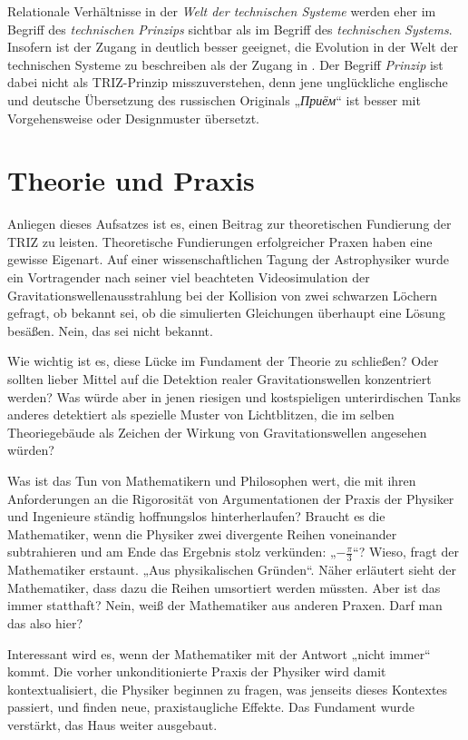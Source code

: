 \documentclass[11pt,a4paper]{article}
\begin{document}
Relationale Verhältnisse in der \emph{Welt der technischen Systeme} werden
eher im Begriff des \emph{technischen Prinzips} sichtbar als im Begriff des
\emph{technischen Systems}. Insofern ist der Zugang in \cite{Shpakovsky2010}
deutlich besser geeignet, die Evolution in der Welt der technischen Systeme zu
beschreiben als der Zugang in \cite{TESE2018}.  Der Begriff \emph{Prinzip} ist
dabei nicht als TRIZ-Prinzip misszuverstehen, denn jene unglückliche englische
und deutsche Übersetzung des russischen Originals
„\emph{\foreignlanguage{russian}{Приём}}“ ist besser mit Vorgehensweise oder
Designmuster übersetzt.

\section{Theorie und Praxis}

Anliegen dieses Aufsatzes ist es, einen Beitrag zur theoretischen Fundierung
der TRIZ zu leisten. Theoretische Fundierungen erfolgreicher Praxen haben eine
gewisse Eigenart. Auf einer wissenschaftlichen Tagung der Astrophysiker wurde
ein Vortragender nach seiner viel beachteten Videosimulation der
Gravitationswellenausstrahlung bei der Kollision von zwei schwarzen Löchern
gefragt, ob bekannt sei, ob die simulierten Gleichungen überhaupt eine Lösung
besäßen.  Nein, das sei nicht bekannt.

Wie wichtig ist es, diese Lücke im Fundament der Theorie zu schließen? Oder
sollten lieber Mittel auf die Detektion realer Gravitationswellen konzentriert
werden?  Was würde aber in jenen riesigen und kostspieligen unterirdischen
Tanks anderes detektiert als spezielle Muster von Lichtblitzen, die im selben
Theoriegebäude als Zeichen der Wirkung von Gravitationswellen angesehen
würden?

Was ist das Tun von Mathematikern und Philosophen wert, die mit ihren
Anforderungen an die Rigorosität von Argumentationen der Praxis der Physiker
und Ingenieure ständig hoffnungslos hinterherlaufen? Braucht es die
Mathematiker, wenn die Physiker zwei divergente Reihen voneinander
subtrahieren und am Ende das Ergebnis stolz verkünden: „$-\frac{\pi}{3}$“?
Wieso, fragt der Mathematiker erstaunt. „Aus physikalischen Gründen“.  Näher
erläutert sieht der Mathematiker, dass dazu die Reihen umsortiert werden
müssten.  Aber ist das immer statthaft? Nein, weiß der Mathematiker aus
anderen Praxen.  Darf man das also hier?

Interessant wird es, wenn der Mathematiker mit der Antwort „nicht immer“
kommt. Die vorher unkonditionierte Praxis der Physiker wird damit
kontextualisiert, die Physiker beginnen zu fragen, was jenseits dieses
Kontextes passiert, und finden neue, praxistaugliche Effekte.  Das Fundament
wurde verstärkt, das Haus weiter ausgebaut.
\end{document}
